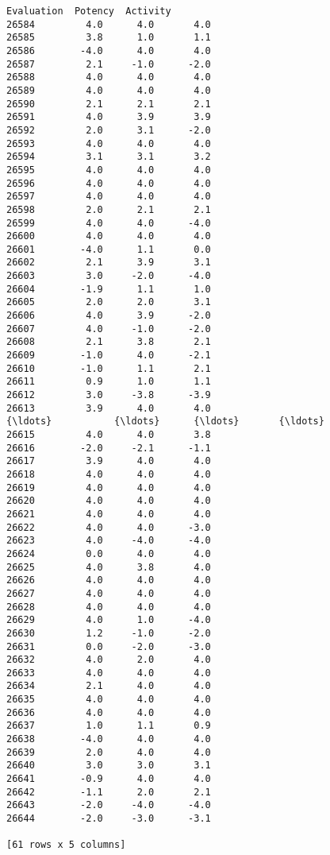 \documentclass[11pt]{article}
\begin{document}
\begin{Verbatim}[commandchars=\\\{\}]
       Evaluation  Potency  Activity  
26584         4.0      4.0       4.0  
26585         3.8      1.0       1.1  
26586        -4.0      4.0       4.0  
26587         2.1     -1.0      -2.0  
26588         4.0      4.0       4.0  
26589         4.0      4.0       4.0  
26590         2.1      2.1       2.1  
26591         4.0      3.9       3.9  
26592         2.0      3.1      -2.0  
26593         4.0      4.0       4.0  
26594         3.1      3.1       3.2  
26595         4.0      4.0       4.0  
26596         4.0      4.0       4.0  
26597         4.0      4.0       4.0  
26598         2.0      2.1       2.1  
26599         4.0      4.0      -4.0  
26600         4.0      4.0       4.0  
26601        -4.0      1.1       0.0  
26602         2.1      3.9       3.1  
26603         3.0     -2.0      -4.0  
26604        -1.9      1.1       1.0  
26605         2.0      2.0       3.1  
26606         4.0      3.9      -2.0  
26607         4.0     -1.0      -2.0  
26608         2.1      3.8       2.1  
26609        -1.0      4.0      -2.1  
26610        -1.0      1.1       2.1  
26611         0.9      1.0       1.1  
26612         3.0     -3.8      -3.9  
26613         3.9      4.0       4.0  
{\ldots}           {\ldots}      {\ldots}       {\ldots}  
26615         4.0      4.0       3.8  
26616        -2.0     -2.1      -1.1  
26617         3.9      4.0       4.0  
26618         4.0      4.0       4.0  
26619         4.0      4.0       4.0  
26620         4.0      4.0       4.0  
26621         4.0      4.0       4.0  
26622         4.0      4.0      -3.0  
26623         4.0     -4.0      -4.0  
26624         0.0      4.0       4.0  
26625         4.0      3.8       4.0  
26626         4.0      4.0       4.0  
26627         4.0      4.0       4.0  
26628         4.0      4.0       4.0  
26629         4.0      1.0      -4.0  
26630         1.2     -1.0      -2.0  
26631         0.0     -2.0      -3.0  
26632         4.0      2.0       4.0  
26633         4.0      4.0       4.0  
26634         2.1      4.0       4.0  
26635         4.0      4.0       4.0  
26636         4.0      4.0       4.0  
26637         1.0      1.1       0.9  
26638        -4.0      4.0       4.0  
26639         2.0      4.0       4.0  
26640         3.0      3.0       3.1  
26641        -0.9      4.0       4.0  
26642        -1.1      2.0       2.1  
26643        -2.0     -4.0      -4.0  
26644        -2.0     -3.0      -3.1  

[61 rows x 5 columns]

    \end{Verbatim}
\end{document}
